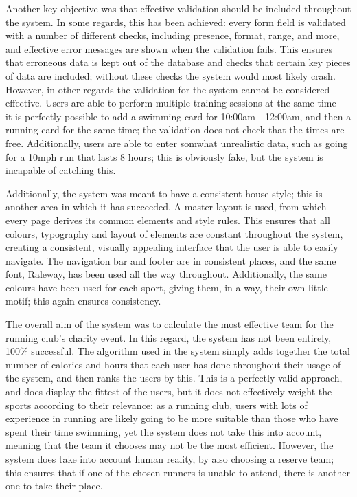 \documentclass{article}[12pt,a4paper]
\begin{document}
{Another key objective was that effective validation should be included throughout the system. In some regards, this has been achieved: every form field is validated with a number of different checks, including presence, format, range, and more, and effective error messages are shown when the validation fails. This ensures that erroneous data is kept out of the database and checks that certain key pieces of data are included; without these checks the system would most likely crash. However, in other regards the validation for the system cannot be considered effective. Users are able to perform multiple training sessions at the same time - it is perfectly possible to add a swimming card for 10:00am - 12:00am, and then a running card for the same time; the validation does not check that the times are free. Additionally, users are able to enter somwhat unrealistic data, such as going for a 10mph run that lasts 8 hours; this is obviously fake, but the system is incapable of catching this.

Additionally, the system was meant to have a consistent house style; this is another area in which it has succeeded. A master layout is used, from which every page derives its common elements and style rules. This ensures that all colours, typography and layout of elements are constant throughout the system, creating a consistent, visually appealing interface that the user is able to easily navigate. The navigation bar and footer are in consistent places, and the same font, Raleway, has been used all the way throughout. Additionally, the same colours have been used for each sport, giving them, in a way, their own little motif; this again ensures consistency.

The overall aim of the system was to calculate the most effective team for the running club's charity event. In this regard, the system has not been entirely, 100\% successful. The algorithm used in the system simply adds together the total number of calories and hours that each user has done throughout their usage of the system, and then ranks the users by this. This is a perfectly valid approach, and does display the fittest of the users, but it does not effectively weight the sports according to their relevance: as a running club, users with lots of experience in running are likely going to be more suitable than those who have spent their time swimming, yet the system does not take this into account, meaning that the team it chooses may not be the most efficient. However, the system does take into account human reality, by also choosing a reserve team; this ensures that if one of the chosen runners is unable to attend, there is another one to take their place.

}
\end{document}
